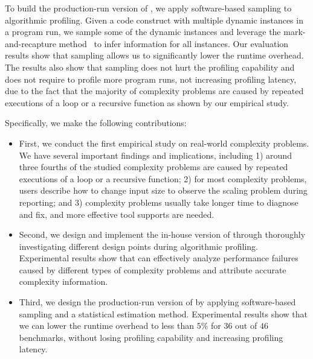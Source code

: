 To build the production-run version of \Tool,
we apply software-based sampling to algorithmic profiling.
Given a code construct with multiple dynamic instances in a program run,
we sample some of the dynamic instances and leverage the mark-and-recapture 
method~\citep{mark-recapture} to infer information for all instances. 
Our evaluation results show that 
sampling allows us to significantly lower the runtime overhead.
The results also show that sampling does not hurt the profiling capability 
and does not require to profile more program runs, 
not increasing profiling latency, due to the fact that
the majority of complexity problems are caused by 
repeated executions of a loop or a recursive function as shown by our empirical study.



Specifically, we make the following contributions:

\begin{itemize}

\item First, we conduct the first empirical study on real-world complexity problems. 
We have several important findings and implications, including
1) around three fourths of the studied complexity problems are 
caused by repeated executions of a loop or a recursive function;
2) for most complexity problems, 
users describe how to change input size to observe the scaling problem during reporting;
and 3) complexity problems usually take longer time to diagnose and fix, 
and more effective tool supports are needed.  

\item Second, we design and implement the in-house version of \Tool through 
thoroughly investigating different design points during algorithmic profiling. 
Experimental results show that \Tool can effectively analyze performance failures 
caused by different types of complexity problems and attribute accurate complexity information.  

\item Third, we design the production-run version of \Tool by applying 
software-based sampling and a statistical estimation method. 
Experimental results show that we can lower the runtime overhead to less than 
$5\%$ for $36$ out of $46$ benchmarks, 
without losing profiling capability and increasing profiling latency.  


\end{itemize}


